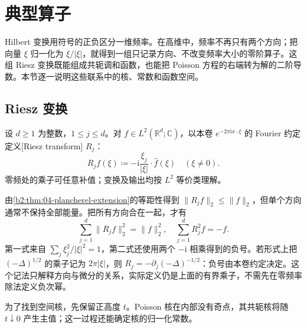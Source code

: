 \section{典型算子}
\label{b2:sec:1805}

Hilbert 变换用符号的正负区分一维频率。在高维中，频率不再只有两个方向；把向量 \(\xi\) 归一化为 \(\xi/|\xi|\)，就得到一组只记录方向、不改变频率大小的零阶算子。这组 Riesz 变换既能组成共轭调和函数，也能把 Poisson 方程的右端转为解的二阶导数。本节逐一说明这些联系中的核、常数和函数空间。

\subsection{Riesz 变换}
\label{b2:subsec:180501}

\begin{definition}\label{b2:thm:18-riesz-definition}
设 \(d\geq1\) 为整数，\(1\leq j\leq d\)。对 \(f\in L^2(\mathbb R^d;\mathbb C)\)，以本卷 \(e^{-2\pi\mathrm ix\cdot\xi}\) 的 Fourier 约定定义[Riesz transform] \(R_j\)：
\[
 \widehat{R_jf}(\xi)\coloneqq
 -\mathrm i\frac{\xi_j}{|\xi|}\cdot\widehat f(\xi)
 \quad(\xi\ne0).
\]
零频处的乘子可任意补值；变换及输出均按 \(L^2\) 等价类理解。
\end{definition}

由\cref{b2:thm:04-plancherel-extension}的等距性得到 \(\|R_jf\|_2\leq\|f\|_2\)，但单个方向通常不保持全部能量。把所有方向合在一起，才有
\[
 \sum_{j=1}^d\|R_jf\|_2^2=\|f\|_2^2,
 \quad \sum_{j=1}^dR_j^2f=-f.
\]
第一式来自 \(\sum_j\xi_j^2/|\xi|^2=1\)，第二式还使用两个 \(-\mathrm i\) 相乘得到的负号。若形式上把 \((-\Delta)^{1/2}\) 的乘子记为 \(2\pi|\xi|\)，则 \(R_j=-\partial_j(-\Delta)^{-1/2}\)：负号由本卷约定决定。这个记法只解释方向与微分的关系，实际定义仍是上面的有界乘子，不需先在零频率除法定义负次幂。

\ProseParagraphBreak

为了找到空间核，先保留正高度 \(t\)。Poisson 核在内部没有奇点，其共轭核将随 \(t\downarrow0\) 产生主值；这一过程还能确定核的归一化常数。

